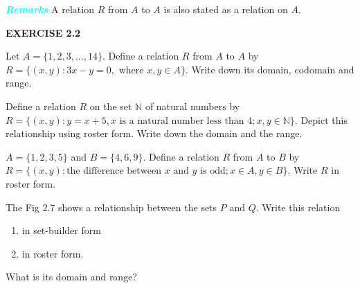 \documentclass[11pt]{article}
\begin{document}
\noindent
\begin{minipage}[t]{\linewidth}
\colorbox{ncertblue}{\textcolor{cyan}{\textbf{\textit{Remarks}}}}
 A relation $R$ from $A$ to $A$ is also stated as a relation on $A$.
\end{minipage}

\begin{center}
\begin{tcolorbox}[
  enhanced,
  width=0.25\textwidth,  
  colframe=cyan!80!black,
  boxrule=1.2pt,
  arc=0mm,                
  left=10pt,
  right=10pt,
  top=8pt,
  bottom=8pt
]
\centering
\textbf{\textcolor{cyan!80!black}{EXERCISE 2.2}}
\end{tcolorbox}
\end{center}

\begin{enumerate}
    \item Let $A = \{1, 2, 3, \dots, 14\}$. Define a relation $R$ from $A$ to $A$ by $R = \{(x, y) : 3x - y = 0, \text{ where } x, y \in A\}$. Write down its domain, codomain and range.

    \item Define a relation $R$ on the set $\mathbb{N}$ of natural numbers by $R = \{(x, y) : y = x + 5, x \text{ is a natural number less than } 4; x, y \in \mathbb{N}\}$. Depict this relationship using roster form. Write down the domain and the range.

    \item $A = \{1, 2, 3, 5\}$ and $B = \{4, 6, 9\}$. Define a relation $R$ from $A$ to $B$ by $R = \{(x, y) : \text{the difference between } x \text{ and } y \text{ is odd}; x \in A, y \in B\}$. Write $R$ in roster form.

    \vspace{10pt}
    \begin{minipage}[t]{0.6\textwidth}
        \item The Fig 2.7 shows a relationship between the sets $P$ and $Q$. Write this relation
        \begin{enumerate}
            \item[(i)] in set-builder form
            \item[(ii)] in roster form.
        \end{enumerate}
        What is its domain and range?


\end{minipage}
\end{enumerate}
\end{document}
